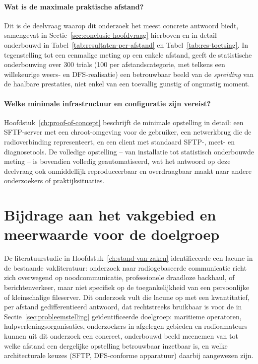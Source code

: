 \paragraph{Wat is de maximale praktische afstand?} Dit is de deelvraag waarop dit
onderzoek het meest concrete antwoord biedt, samengevat in
Sectie~\ref{sec:conclusie-hoofdvraag} hierboven en in detail onderbouwd in
Tabel~\ref{tab:resultaten-per-afstand} en Tabel~\ref{tab:res-toetsing}. In tegenstelling
tot een eenmalige meting op een enkele afstand, geeft de statistische onderbouwing over
300 trials (100 per afstandscategorie, met telkens een willekeurige weers- en
DFS-realisatie) een betrouwbaar beeld van de \emph{spreiding} van de haalbare prestaties,
niet enkel van een toevallig gunstig of ongunstig moment.
 
\paragraph{Welke minimale infrastructuur en configuratie zijn vereist?} Hoofdstuk~\ref{ch:proof-of-concept}
beschrijft de minimale opstelling in detail: een SFTP-server met een chroot-omgeving
voor de gebruiker, een netwerkbrug die de radioverbinding representeert, en een client
met standaard SFTP-, meet- en diagnosetools. De volledige opstelling -- van installatie
tot statistisch onderbouwde meting -- is bovendien volledig geautomatiseerd, wat het
antwoord op deze deelvraag ook onmiddellijk reproduceerbaar en overdraagbaar maakt naar
andere onderzoekers of praktijksituaties.
 
\section{Bijdrage aan het vakgebied en meerwaarde voor de doelgroep}%
\label{sec:conclusie-bijdrage}
 
De literatuurstudie in Hoofdstuk~\ref{ch:stand-van-zaken} identificeerde een lacune in
de bestaande vakliteratuur: onderzoek naar radiogebaseerde communicatie richt zich
overwegend op noodcommunicatie, professionele draadloze backhaul, of berichtenverkeer,
maar niet specifiek op de toegankelijkheid van een persoonlijke of kleinschalige
fileserver. Dit onderzoek vult die lacune op met een kwantitatief, per afstand
gedifferentieerd antwoord, dat rechtstreeks bruikbaar is voor de in
Sectie~\ref{sec:probleemstelling} geïdentificeerde doelgroep: maritieme operatoren,
hulpverleningsorganisaties, onderzoekers in afgelegen gebieden en radioamateurs kunnen
uit dit onderzoek een concreet, onderbouwd beeld meenemen van tot welke afstand een
dergelijke opstelling betrouwbaar inzetbaar is, en welke architecturale keuzes (SFTP,
DFS-conforme apparatuur) daarbij aangewezen zijn.
 
